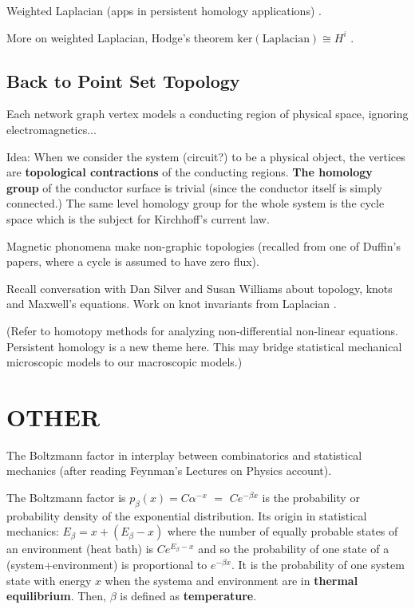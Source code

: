 \documentclass{article}
\begin{document}
Weighted Laplacian (apps in persistent homology applications)
\cite{WuWeightedCoHLaplacian}.

More on weighted Laplacian, Hodge's theorem
$\text{ker}(\text{Laplacian}) \cong H^i$
\cite{HorakJostSpecCombLaplaceWeightedToo}.

\subsection{Back to Point Set Topology}

Each network graph vertex models a conducting region of physical space, 
ignoring electromagnetics...

Idea: When we consider the system (circuit?) to be a physical object, the 
vertices are \textbf{topological contractions} of the conducting regions.
\textbf{The homology group} of the conductor surface is trivial (since the
conductor itself is simply connected.)   The same level homology group for 
the whole system is the cycle space which is the subject for Kirchhoff's 
current law.

Magnetic phonomena make non-graphic topologies (recalled from one of 
Duffin's papers, where a cycle is assumed to have zero flux).

Recall conversation with Dan Silver and Susan Williams about topology, knots and Maxwell's equations.  Work on knot invariants from Laplacian
\cite{SilverWilliamsKnotLaplacian}.

(Refer to homotopy methods for analyzing non-differential non-linear 
equations.  Persistent homology is a new theme here.  This may bridge
statistical mechanical microscopic models to our macroscopic models.)

\section{OTHER}

The Boltzmann factor in interplay between combinatorics and statistical
mechanics (after reading Feynman's Lectures on Physics account).

The Boltzmann factor is 
$p_{\beta}(x)= C\alpha^{-x}$ $=$ $Ce^{-\beta x}$ is the probability 
or probability density of the exponential distribution.
Its origin in statistical mechanics:  $E_\beta = x + (E_\beta-x)$ where the 
number of equally probable states of an environment (heat bath) 
is $Ce^{E_\beta - x}$ and so the probability of one state of a 
(system+environment) is proportional to $e^{-\beta x}$.  It is the probability
of one system state with energy $x$ when the systema and environment are
in \textbf{thermal equilibrium}.  Then, $\beta$ is defined as 
\textbf{temperature}.
\end{document}
